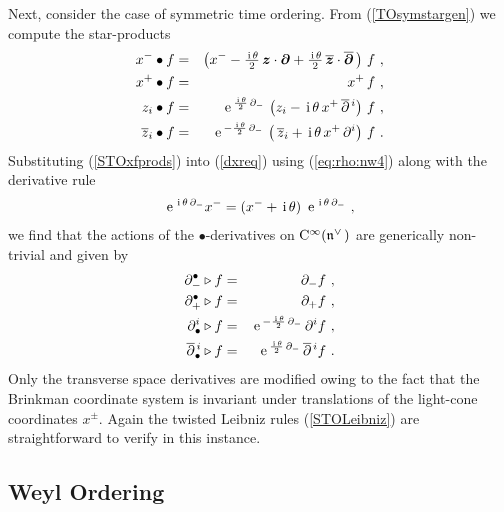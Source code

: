 \documentclass[11pt,a4paper]{article}
\newcommand{\1}{\mathbb{1}}
\newcommand{\mbf}[1]{{\boldsymbol {#1} }}
\def\ii{{\,{\rm i}\,}}
\def\CC{{\rm C}}
\def\mz{{\mbf z}}
\def\mdell{{\mbf\partial}}
\def\mfn{{\mathfrak n}}
\def\e{{\,\rm e}\,}
\def\bea{\begin{eqnarray}}
\def\eea{\end{eqnarray}}
\newcommand{\beq}{\begin{eqnarray}}
\newcommand{\eeq}{\end{eqnarray}}
\begin{document}
Next, consider the case of symmetric time ordering. From
(\ref{TOsymstargen}) we compute the star-products
\bea
x^-\bullet f&=&\left(x^--\mbox{$\frac{\ii\theta}2$}\,
\mz\cdot\mdell+\mbox{$\frac{\ii\theta}2$}\,\overline{\mz}
\cdot\overline{\mdell}\,\right)\,f \ , \nonumber\\
x^+\bullet f&=&x^+\,f \ , \nonumber\\
z_i\bullet f&=&\e^{\frac{\ii\theta}2\,\partial_-}\,
\left(z_i-\ii\theta\,x^+\,\overline{\partial}{}^{\,i}
\right)\,f  \ , \nonumber\\
\overline{z}_i\bullet f&=&\e^{-\frac{\ii\theta}2\,\partial_-}\,
\left(\,\overline{z}_i+\ii\theta\,
x^+\,\partial^i\right)\,f \ .
\label{STOxfprods}\eea
Substituting (\ref{STOxfprods}) into (\ref{dxreq}) using
(\ref{eq:rho:nw4}) along with the derivative rule
\beq
\e^{\ii\theta\,\partial_-}x^-=(x^-+\ii\theta)~\e^{\ii\theta\,
\partial_-} \ ,
\label{derivrule1}\eeq
we find that the actions of the $\bullet$-derivatives on
$\CC^\infty(\mfn^{\vee\,})$ are generically non-trivial and given by
\bea
\partial_-^\bullet\triangleright f&=&\partial_-f \ , \nonumber\\
\partial_+^\bullet\triangleright f&=&\partial_+f \ , \nonumber\\
\partial^i_\bullet\triangleright f&=&\e^{-\frac{\ii\theta}2\,
\partial_-}\,\partial^if \ , \nonumber\\
\overline{\partial}{}^{\,i}_\bullet\triangleright f&=&
\e^{\frac{\ii\theta}2\,\partial_-}\,
\overline{\partial}{}^{\,i}f \ .
\label{STOderivs}\eea
Only the transverse space derivatives are modified owing to the fact
that the Brinkman coordinate system is invariant under translations of
the light-cone coordinates $x^\pm$. Again the twisted Leibniz rules
(\ref{STOLeibniz}) are straightforward to verify in this instance.

\subsection{Weyl Ordering \label{Weylderiv}}
\end{document}
